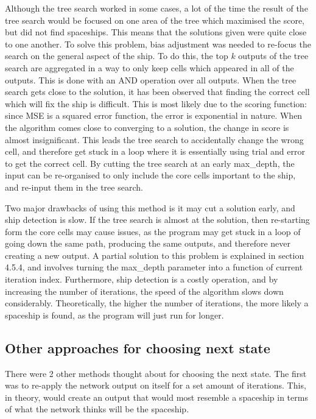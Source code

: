 \documentclass{l4proj}
\begin{document}
Although the tree search worked in some cases, a lot of the time the result of the tree search would be focused on one area of the tree which maximised the score, but did not find spaceships. This means that the solutions given were quite close to one another. To solve this problem, bias adjustment was needed to re-focus the search on the general aspect of the ship. To do this, the top $k$ outputs of the tree search are aggregated in a way to only keep cells which appeared in all of the outputs. This is done with an AND operation over all outputs. When the tree search gets close to the solution, it has been observed that finding the correct cell which will fix the ship is difficult. This is most likely due to the scoring function: since MSE is a squared error function, the error is exponential in nature. When the algorithm comes close to converging to a solution, the change in score is almost insignificant. This leads the tree search to accidentally change the wrong cell, and therefore get stuck in a loop where it is essentially using trial and error to get the correct cell. By cutting the tree search at an early max\_depth, the input can be re-organised to only include the core cells important to the ship, and re-input them in the tree search. 

Two major drawbacks of using this method is it may cut a solution early, and ship detection is slow. If the tree search is almost at the solution, then re-starting form the core cells may cause issues, as the program may get stuck in a loop of going down the same path, producing the same outputs, and therefore never creating a new output. A partial solution to this problem is explained in section 4.5.4, and involves turning the max\_depth parameter into a function of current iteration index. Furthermore, ship detection is a costly operation, and by increasing the number of iterations, the speed of the algorithm slows down considerably. Theoretically, the higher the number of iterations, the more likely a spaceship is found, as the program will just run for longer.

\subsection{Other approaches for choosing next state}

There were 2 other methods thought about for choosing the next state. The first was to re-apply the network output on itself for a set amount of iterations. This, in theory, would create an output that would most resemble a spaceship in terms of what the network thinks will be the spaceship.
\end{document}
